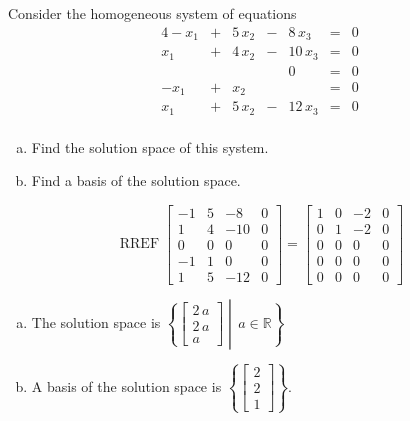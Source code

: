 
\begin{exerciseStatement}


Consider the homogeneous system of equations 
\begin{alignat*}{4} -x_{1} &+& 5 \, x_{2} &-& 8 \, x_{3} &=& 0 \\x_{1} &+& 4 \, x_{2} &-& 10 \, x_{3} &=& 0 \\ & &  & & 0 &=& 0 \\-x_{1} &+& x_{2} & &  &=& 0 \\x_{1} &+& 5 \, x_{2} &-& 12 \, x_{3} &=& 0 \\ \end{alignat*}
            


\begin{enumerate}[(a)]
\item  Find the solution space of this system.
\item  Find a basis of the solution space.
\end{enumerate}
    
\end{exerciseStatement}
    
\begin{exerciseAnswer} 


\[\operatorname{RREF} \left[\begin{array}{ccc|c}
-1 & 5 & -8 & 0 \\
1 & 4 & -10 & 0 \\
0 & 0 & 0 & 0 \\
-1 & 1 & 0 & 0 \\
1 & 5 & -12 & 0
\end{array}\right] = \left[\begin{array}{ccc|c}
1 & 0 & -2 & 0 \\
0 & 1 & -2 & 0 \\
0 & 0 & 0 & 0 \\
0 & 0 & 0 & 0 \\
0 & 0 & 0 & 0
\end{array}\right] \]


\begin{enumerate}[(a)]
\item The solution space is \( \left\{ \left[\begin{array}{c}
2 \, a \\
2 \, a \\
a
\end{array}\right] \middle|\,a\in\mathbb{R}\right\} \)
\item A basis of the solution space is \( \left\{ \left[\begin{array}{c}
2 \\
2 \\
1
\end{array}\right] \right\} \).
\end{enumerate}
    
\end{exerciseAnswer}
    
